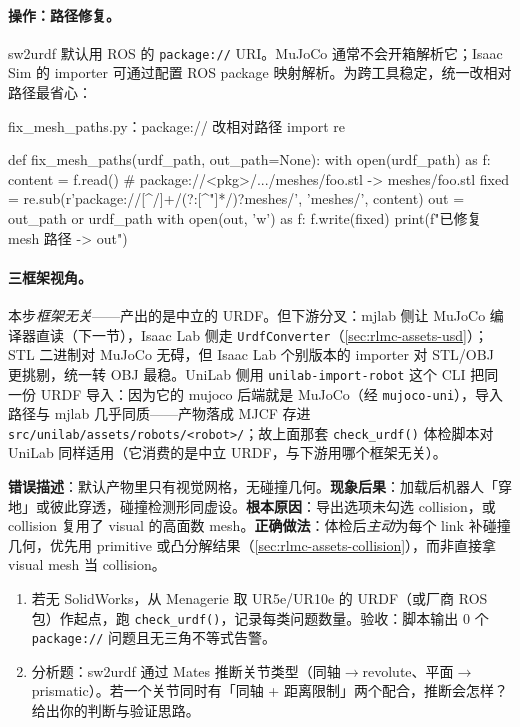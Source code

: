 \paragraph{操作：路径修复。}sw2urdf 默认用 ROS 的 \texttt{package://} URI。MuJoCo 通常不会开箱解析它；Isaac Sim 的 importer 可通过配置 ROS package 映射解析。为跨工具稳定，统一改相对路径最省心：

\begin{codebox}[Python]{fix\_mesh\_paths.py：package:// 改相对路径}
import re

def fix_mesh_paths(urdf_path, out_path=None):
    with open(urdf_path) as f:
        content = f.read()
    # package://<pkg>/.../meshes/foo.stl -> meshes/foo.stl
    fixed = re.sub(r'package://[^/]+/(?:[^"]*/)?meshes/', 'meshes/', content)
    out = out_path or urdf_path
    with open(out, 'w') as f:
        f.write(fixed)
    print(f"已修复 mesh 路径 -> {out}")
\end{codebox}

\paragraph{三框架视角。}本步\emph{框架无关}——产出的是中立的 URDF。但下游分叉：mjlab 侧让 MuJoCo 编译器直读（下一节），Isaac Lab 侧走 \texttt{UrdfConverter}（\cref{sec:rlmc-assets-usd}）；STL 二进制对 MuJoCo 无碍，但 Isaac Lab 个别版本的 importer 对 STL/OBJ 更挑剔，统一转 OBJ 最稳。UniLab 侧用 \texttt{unilab-import-robot} 这个 CLI 把同一份 URDF 导入：因为它的 mujoco 后端就是 MuJoCo（经 \texttt{mujoco-uni}），导入路径与 mjlab 几乎同质——产物落成 MJCF 存进 \verb|src/unilab/assets/robots/<robot>/|；故上面那套 \texttt{check\_urdf()} 体检脚本对 UniLab 同样适用（它消费的是中立 URDF，与下游用哪个框架无关）。

\begin{pitfall}
\textbf{错误描述}：默认产物里只有视觉网格，无碰撞几何。\textbf{现象后果}：加载后机器人「穿地」或彼此穿透，碰撞检测形同虚设。\textbf{根本原因}：导出选项未勾选 collision，或 collision 复用了 visual 的高面数 mesh。\textbf{正确做法}：体检后\emph{主动}为每个 link 补碰撞几何，优先用 primitive 或凸分解结果（\cref{sec:rlmc-assets-collision}），而非直接拿 visual mesh 当 collision。
\end{pitfall}

\begin{practice}
\begin{enumerate}
  \item 若无 SolidWorks，从 Menagerie 取 UR5e/UR10e 的 URDF（或厂商 ROS 包）作起点，跑 \texttt{check\_urdf()}，记录每类问题数量。验收：脚本输出 0 个 \texttt{package://} 问题且无三角不等式告警。
  \item 分析题：sw2urdf 通过 Mates 推断关节类型（同轴$\to$revolute、平面$\to$prismatic）。若一个关节同时有「同轴 + 距离限制」两个配合，推断会怎样？给出你的判断与验证思路。
\end{enumerate}
\end{practice}

